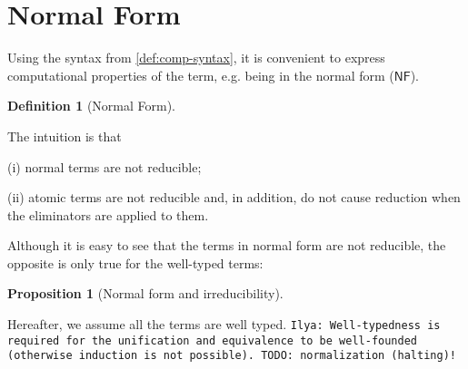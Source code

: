 \documentclass[a4,natbib=false]{article}
\newtheorem{definition}{Definition}
\newtheorem{proposition}{Proposition}
\newcommand{\ilyam}[1]{{\color{red} \texttt{Ilya:  #1}}}
\newcommand{\reduces}[2]{{#1} \rightarrow {#2}}
\newcommand{\narg}[1]{|{#1}|}
\newcommand{\judgeSnf}[1]{{#1}\,\mathsf{NF}}
\newcommand{\judgeSatom}[1]{{#1}\,\mathsf{ATOM}}
\newcommand{\fullterm}[2]{{#1}\,#2_1 \dots #2_{\narg{#1}}}
\newcommand{\Infer}[3]{\inferrule*[right={#1}]{#2}{#3}}
\begin{document}
\section{Normal Form}

Using the syntax from \cref{def:comp-syntax}, it is convenient to express
computational properties of the term, e.g. being in the normal form
($\mathsf{NF}$).

\begin{definition}[Normal Form]
\end{definition}

The intuition is that
\begin{enumerate*}
\item[(i)] normal terms are not reducible;
\item[(ii)] atomic terms are not reducible and, in addition, do not cause
  reduction when the eliminators are applied to them.
\end{enumerate*}

Although it is easy to see that the terms in normal form are not reducible,
the opposite is only true for the well-typed terms:

\begin{proposition}[Normal form and irreducibility]
  \label{prop:nf-irred}
\end{proposition}

Hereafter, we assume all the terms are well typed.
\ilyam{Well-typedness is required for the unification and equivalence to be
  well-founded (otherwise induction is not possible). TODO: normalization (halting)!}

\end{document}
